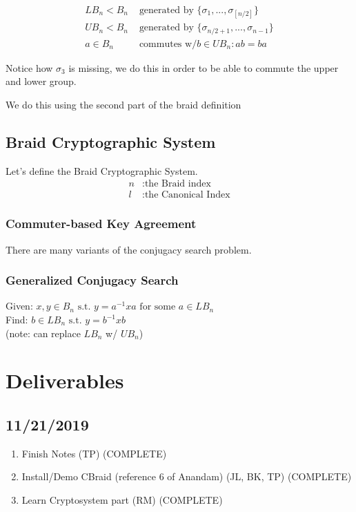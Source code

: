 \documentclass{article}
\theoremstyle{definition}
\begin{document}
	\begin{align*}
		LB_n < B_n & \text{ generated by } \{ \sigma_1 , ..., \sigma_{ \left[ n/2 \right] } \}  \\
		UB_n < B_n & \text{ generated by } \{ \sigma_{ n/2 + 1 }, ..., \sigma_{n-1} \} \\
		a \in B_n & \text{ commutes w/} b \in UB_n : ab = ba 
	\end{align*}
	
	Notice how $\sigma_3$ is missing, we do this in order to be able to commute the upper and lower group.
	
	We do this using the second part of the braid definition
	
	\subsection{Braid Cryptographic System}
	Let's define the Braid Cryptographic System.
	\begin{align*}
	n &: \text{the Braid index} \\
	l &: \text{the Canonical Index}
	\end{align*}
	
	\subsubsection{Commuter-based Key Agreement}
	There are many variants of the conjugacy search problem.
	
	\subsubsection{Generalized Conjugacy Search}
	Given: $x,y \in B_n \text{ s.t. } y=a^{-1}xa \text{ for some } a \in LB_n$ \\
	Find: $b \in LB_n \text{ s.t. } y = b^{-1}xb$ \\
	(note: can replace $LB_n$ w/ $UB_n$)
	
	\section*{Deliverables}
	\subsection*{11/21/2019}
	\begin{enumerate}
		\item Finish Notes (TP) (COMPLETE)
		\item  Install/Demo CBraid (reference 6 of Anandam) (JL, BK, TP) (COMPLETE)
		\item Learn Cryptosystem part (RM) (COMPLETE)
	\end{enumerate}


	
\end{document}

